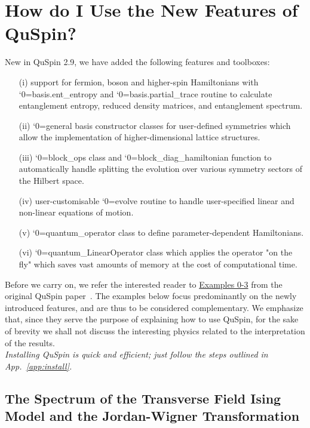 \documentclass{SciPost}
\newcommand\0{\scalebox{-1}[1]{0}}
\let\svttfamily\ttfamily
\renewcommand\ttfamily{\svttfamily\catcode`0=\active }
\renewcommand\texttt{\bgroup\ttfamily\texttthelp}
\def\texttthelp#1{#1\egroup}
\begin{document}
\section{How do I Use the New Features of QuSpin?}
\label{sec:examples}

New in QuSpin 2.9, we have added the following features and toolboxes:
\begin{itemize}
	\item[(i)] support for fermion, boson and higher-spin Hamiltonians with \texttt{basis.ent\_entropy} and \texttt{basis.partial\_trace} routine to calculate entanglement entropy, reduced density matrices, and entanglement spectrum.
	\item[(ii)] \texttt{general} basis constructor classes for user-defined symmetries which allow the implementation of higher-dimensional lattice structures.
	\item[(iii)] \texttt{block\_ops} class and \texttt{block\_diag\_hamiltonian} function to automatically handle splitting the evolution over various symmetry sectors of the Hilbert space.
	\item[(iv)] user-customisable \texttt{evolve} routine to handle user-specified linear and non-linear equations of motion.
	\item[(v)] \texttt{quantum\_operator} class to define parameter-dependent Hamiltonians.
	\item[(vi)] \texttt{quantum\_LinearOperator} class which applies the operator "on the fly" which saves vast amounts of memory at the cost of computational time. 
\end{itemize}

\noindent Before we carry on, we refer the interested reader to \href{http://weinbe58.github.io/QuSpin/Examples.html}{Examples 0-3} from the original QuSpin paper~\cite{weinberg_17_quspin}. The examples below focus predominantly on the newly introduced features, and are thus to be considered complementary. We emphasize that, since they serve the purpose of explaining how to use QuSpin, for the sake of brevity we shall not discuss the interesting physics related to the interpretation of the results.\\

\emph{Installing QuSpin is quick and efficient; just follow the steps outlined in App.~\ref{app:install}.}


\subsection{The Spectrum of the Transverse Field Ising Model and the Jordan-Wigner Transformation}
\label{subsec:JW}
\end{document}
